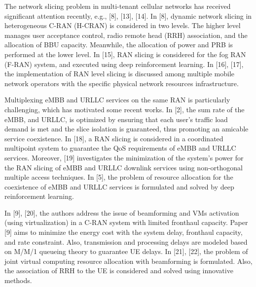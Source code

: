 \documentclass[12pt, letterpaper]{article}
\begin{document}
The network slicing problem in multi-tenant cellular networks has received significant attention recently, e.g., [8],
[13], [14].
In [8], dynamic network slicing in heterogeneous C-RAN (H-CRAN) is considered in two levels. The higher level manages user acceptance control, radio remote head (RRH) association, and the allocation of BBU capacity. Meanwhile, the allocation of power and PRB is performed at the lower level.
In  [15], RAN slicing is considered for the fog RAN (F-RAN) system, and executed using deep reinforcement learning. In  [16], [17], the implementation of RAN level slicing is discussed among multiple mobile network operators with the specific physical network resources infrastructure.

Multiplexing eMBB and URLLC services on the same RAN is particularly challenging, which has motivated some recent works.
In [2], the sum rate of the eMBB, and URLLC, is optimized by ensuring that each user's traffic load demand is met and the slice isolation is guaranteed, thus promoting an amicable service coexistence.
In [18], a RAN slicing is considered in a coordinated multipoint system to guarantee the QoS requirements of eMBB and URLLC services. Moreover, [19] investigates the minimization of the system's power for the  RAN slicing of eMBB and URLLC downlink services using non-orthogonal multiple access techniques.
In  [5], the problem of resource allocation for the coexistence of eMBB and URLLC services is formulated and solved by deep reinforcement learning.
 
In [9], [20], the authors address the issue of beamforming and VMs activation (using virtualization) in a C-RAN system with limited fronthaul capacity.
Paper [9] aims to minimize the energy cost with the system delay, fronthaul capacity, and rate constraint.
Also, transmission and processing delays are modeled based on M/M/1 queueing theory to guarantee UE delays.
In  [21], [22], the problem of joint virtual computing resource allocation with beamforming is formulated. Also, the association of RRH to the UE is considered and solved using innovative methods.
\end{document}
